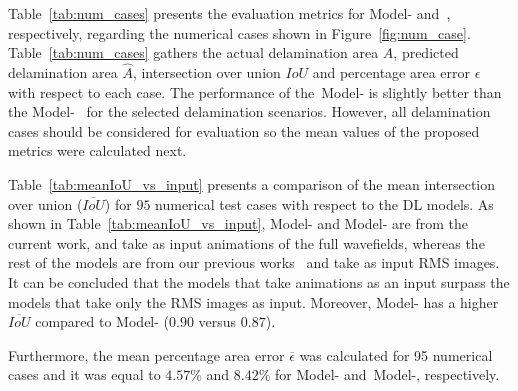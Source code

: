 Table~\ref{tab:num_cases} presents the evaluation metrics for Model- 
and~, respectively, regarding the numerical cases shown in 
Figure~\ref{fig:num_case}.
Table~\ref{tab:num_cases} gathers the actual delamination area \(A\), predicted delamination area \(\hat{A}\), intersection over union \(IoU\) and percentage area error \(\epsilon\) with respect to each case. 
The performance of the~Model- is slightly better than the Model-~ for the selected delamination scenarios.
However, all delamination cases should be considered for evaluation so the mean values of the proposed metrics were calculated next.

Table~\ref{tab:meanIoU_vs_input} presents a comparison of the mean intersection over union (\(\overline{IoU}\)) for \(95\) numerical test cases with respect to the DL models.
As shown in Table~\ref{tab:meanIoU_vs_input}, Model- and Model- are from the current work, and take as input animations of the full wavefields, whereas the rest of the models are from our previous works~\cite{Ijjeh2021, Ijjeh2022} and take as input RMS images.
It can be concluded that the models that take animations as an input surpass the models that take only the RMS images as input. 
Moreover, Model- has a higher \(\overline{IoU}\) compared to Model- (\(0.90\) versus \(0.87\)).

Furthermore, the mean percentage area error \(\overline{\epsilon}\) was 
calculated for 95 numerical cases and it was equal to \(4.57 \%\) and 
\(8.42\%\) for Model- and~Model-, respectively.

